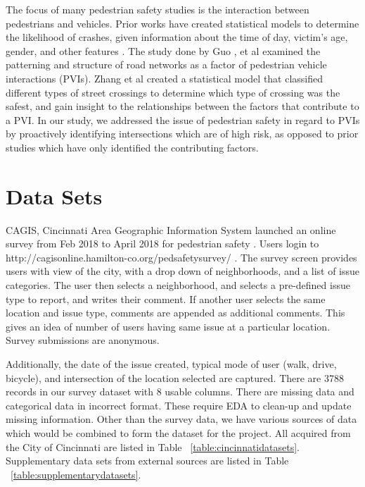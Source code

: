\documentclass{llncs}
\begin{document}
The focus of many pedestrian safety studies is the interaction between pedestrians and vehicles. Prior works have created statistical models to determine the likelihood of crashes, given information about the time of day, victim's age, gender, and other features \cite{brude1993models} \cite{lascala2000demographic} \cite{lyon2002pedestrian} \cite{ladron2004forecasting} \cite{pulugurtha2011pedestrian} \cite{ukkusuri2011random}. The study done by Guo \cite{guo2017effect}, et al examined the patterning and structure of road networks as a factor of pedestrian vehicle interactions (PVIs). Zhang et al \cite{zhang2017quantitative} created a statistical model that classified different types of street crossings to determine which type of crossing was the safest, and gain insight to the relationships between the factors that contribute to a PVI. In our study, we addressed the issue of pedestrian safety in regard to PVIs by proactively identifying intersections which are of high risk, as opposed to prior studies which have only identified the contributing factors.


\section{Data Sets}
%
%
CAGIS, Cincinnati Area Geographic Information System launched an online survey from Feb 2018 to April 2018 for pedestrian safety \cite{cvg2018city}. Users login to http://cagisonline.hamilton-co.org/pedsafetysurvey/ . The survey screen provides users with view of the city, with a drop down of neighborhoods, and a list of issue categories. The user then selects a neighborhood, and selects a pre-defined issue type to report, and writes their comment. If another user selects the same location and issue type, comments are appended as additional comments. This gives an idea of number of users having same issue at a particular location. Survey submissions are anonymous.

Additionally, the date of the issue created, typical mode of user (walk, drive, bicycle), and intersection of the location selected are captured. There are 3788 records in our survey dataset with 8 usable columns.  There are missing data and categorical data in incorrect format. These require EDA to clean-up and update missing information. Other than the survey data, we have various sources of data which would be combined to form the dataset for the project. All acquired from the City of Cincinnati are listed in Table ~\ref{table:cincinnatidatasets}. Supplementary data sets from external sources are listed in Table ~\ref{table:supplementarydatasets}. 
\end{document}
